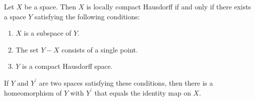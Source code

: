 \begin{theorem}
\label{thm:\thetheorem}
 Let \(X\) be a space. Then \(X\) is locally compact Hausdorff if and only if there exists a space \(Y\) satisfying the following conditions:

 \begin{enumerate}[itemsep=0.2em, parsep=0pt, topsep=0pt, partopsep=0pt, leftmargin=*, label=(\arabic*), align=left]
 \item \(X\) is a subspace of \(Y\).
 \item The set \(Y - X\) consists of a single point.
 \item \(Y\) is a compact Hausdorff space.
 \end{enumerate}

If \(Y\) and \(Y^{\prime }\) are two spaces satisfying these conditions, then there is a homeomorphism of \(Y\) with \(Y^{\prime }\) that equals the identity map on \(X\).

\end{theorem}
